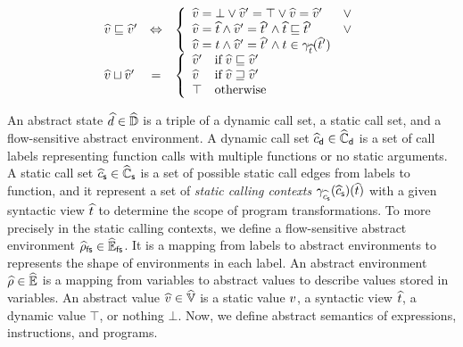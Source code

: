 \documentclass[10pt,conference]{IEEEtran}
\begin{document}
\begin{itemize}
\[\begin{array}{lcl}
        \widehat{v} \sqsubseteq \widehat{v}' &\Leftrightarrow& \left\{
          \begin{array}{ll}
            \widehat{v} = \bot \vee \widehat{v}' = \top \vee \widehat{v} = \widehat{v}' & \vee\\
            \widehat{v} = \widehat{t} \wedge \widehat{v}' = \widehat{t}' \wedge
            \widehat{t} \sqsubseteq \widehat{t}' &\vee\\
            \widehat{v} = t \wedge \widehat{v}' = \widehat{t}' \wedge t \in
            \gamma_{\widehat{t}}(\widehat{t}')\\
          \end{array}
        \right.\\

        \widehat{v} \sqcup \widehat{v}' &=& \left\{
          \begin{array}{ll}
            \widehat{v}' & \text{if} \; \widehat{v} \sqsubseteq \widehat{v}'\\
            \widehat{v} & \text{if} \; \widehat{v} \sqsupseteq \widehat{v}'\\
            \top & \text{otherwise}\\
          \end{array}
        \right.\\
      \end{array}
    \]
\end{itemize}

An abstract state $\widehat{d} \in \widehat{\mathbb{D}}$ is a triple of a dynamic call set, a
static call set, and a flow-sensitive abstract environment.  A dynamic call set
$\widehat{c}_{\textsf{d}} \in \widehat{\mathbb{C}}_{\textsf{d}}$ is a set of call labels representing function calls
with multiple functions or no static arguments. A static call set $\widehat{c}_{\textsf{s}} \in
\widehat{\mathbb{C}}_{\textsf{s}}$ is a set of possible static call edges from labels to function, and
it represent a set of \textit{static calling contexts}
$\gamma_{\widehat{c}_{\textsf{s}}}(\widehat{c}_{\textsf{s}})(\widehat{t})$ with a given syntactic view $\widehat{t}$ to
determine the scope of program transformations.  To more precisely in the static
calling contexts, we define a flow-sensitive abstract environment $\widehat{\rho}_{\textsf{fs}} \in
\widehat{\mathbb{E}}_{\textsf{fs}}$. It is a mapping from labels to abstract environments to represents
the shape of environments in each label. An abstract environment $\widehat{\rho} \in
\widehat{\mathbb{E}}$ is a mapping from variables to abstract values to describe values
stored in variables. An abstract value $\widehat{v} \in \widehat{\mathbb{V}}$ is a static value
$v$, a syntactic view $\widehat{t}$, a dynamic value $\top$, or nothing $\bot$.
Now, we define abstract semantics of expressions, instructions, and programs.
\end{document}
